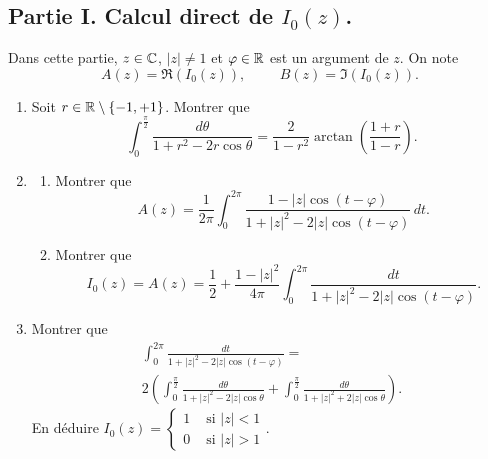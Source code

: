 \subsection*{Partie I. Calcul direct de $I_0(z)$.}
Dans cette partie, $z \in \mathbb{C}$, $|z|\neq 1$ et $\varphi\in \mathbb{R}$ est un argument de $z$. On note
\[
 A(z) = \Re(I_0(z)), \hspace{1cm} B(z) = \Im(I_0(z)).
\]
\begin{enumerate}
 \item Soit $r \in \mathbb{R} \setminus\left\lbrace -1, +1 \right\rbrace$. Montrer que
\[
 \int_0^{\frac{\pi}{2}}\frac{d\theta}{1+r^2 - 2r\cos \theta}
 =
 \frac{2}{1-r^2}\arctan\left( \frac{1 + r}{1 - r}\right) .
\]

 \item 
 \begin{enumerate}
  \item  Montrer que
\[
 A(z) = \frac{1}{2\pi}\int_{0}^{2\pi}\frac{1 - |z| \cos(t-\varphi)}{1 + |z|^2 - 2|z|\cos(t-\varphi)}\, dt.
\]
  \item Montrer que 
\[
 I_0(z) = A(z) = \frac{1}{2} + 
 \frac{1-|z|^2}{4\pi}
 \int_0^{2\pi}\frac{dt}{1 + |z|^2 - 2|z|\cos(t-\varphi)}.
\]
 \end{enumerate}

  \item Montrer que
\begin{multline*}
 \int_0^{2\pi}\frac{dt}{1 + |z|^2 - 2|z|\cos(t-\varphi)} = \\
 2\left( 
 \int_0^{\frac{\pi}{2}}\frac{d\theta}{1 + |z|^2 - 2|z|\cos \theta}
 +
 \int_0^{\frac{\pi}{2}}\frac{d\theta}{1 + |z|^2 + 2|z|\cos \theta}
 \right) .
\end{multline*}
En déduire
$
I_0(z)=
\left\lbrace 
\begin{aligned}
 1 &\text{ si } |z| < 1\\
 0 &\text{ si } |z| > 1
\end{aligned}
\right. 
$.
\end{enumerate}

